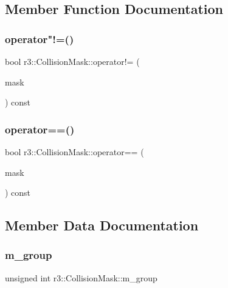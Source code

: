 \subsection{Member Function Documentation}
\mbox{\label{structr3_1_1_collision_mask_ae6bbe0e4390b584497c854d39ec12c6a}} 
\subsubsection{\texorpdfstring{operator"!=()}{operator!=()}}
{\footnotesize\ttfamily bool r3\+::\+Collision\+Mask\+::operator!= (\begin{DoxyParamCaption}\item[{const \mbox{\hyperlink{structr3_1_1_collision_mask}{Collision\+Mask}} \&}]{mask }\end{DoxyParamCaption}) const}

\mbox{\label{structr3_1_1_collision_mask_a7d1315f7324fc03cee09df2c364f5c54}} 
\subsubsection{\texorpdfstring{operator==()}{operator==()}}
{\footnotesize\ttfamily bool r3\+::\+Collision\+Mask\+::operator== (\begin{DoxyParamCaption}\item[{const \mbox{\hyperlink{structr3_1_1_collision_mask}{Collision\+Mask}} \&}]{mask }\end{DoxyParamCaption}) const}



\subsection{Member Data Documentation}
\mbox{\label{structr3_1_1_collision_mask_a07999f53c748c86623b00e4e07d24d5f}} 
\subsubsection{\texorpdfstring{m\+\_\+group}{m\_group}}
{\footnotesize\ttfamily unsigned int r3\+::\+Collision\+Mask\+::m\+\_\+group}


